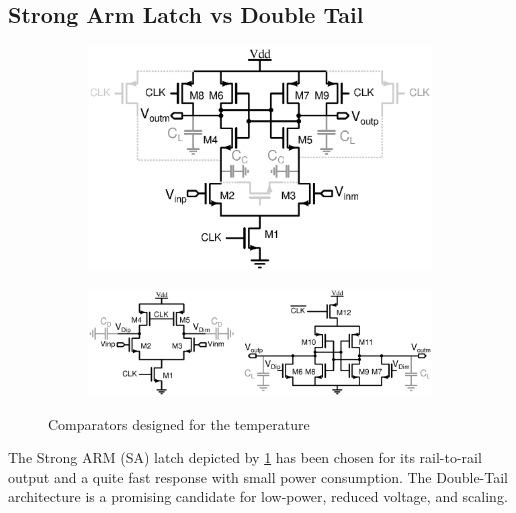     \subsection{Strong Arm Latch vs Double Tail} %
\begin{figure}[htp]
    \centering
    \begin{subfigure}[b]{0.36\textwidth}
        \centering
        \includegraphics[width=\textwidth]{Chapter7/Figs/sa_designed.eps}
        \label{fig:sa_designed}
    \end{subfigure}
    \begin{subfigure}[b]{0.62\textwidth}
        \centering
        \includegraphics[width=\textwidth]{Chapter7/Figs/dtl_designed.eps}
        \label{fig:dtl_designed}
    \end{subfigure}
    \caption{Comparators designed for the temperature}
    \label{fig:cmp_designed}
\end{figure}

The Strong ARM (SA) latch depicted by \figurename\ref{fig:sa_designed} has been chosen for its rail-to-rail output and a quite fast response with small power consumption. The Double-Tail architecture is a promising candidate for low-power, reduced voltage, and scaling. 
